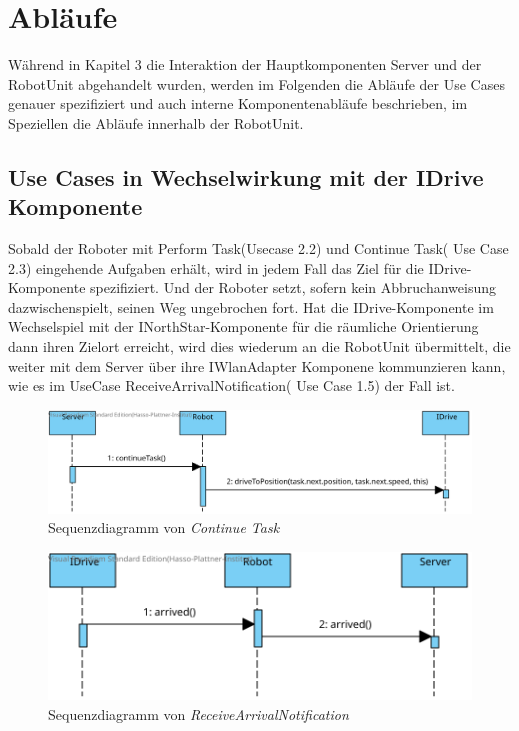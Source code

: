 \section{Abläufe}

Während in Kapitel 3 die Interaktion der Hauptkomponenten Server und der RobotUnit abgehandelt wurden, werden im Folgenden die Abläufe der Use Cases genauer spezifiziert und auch interne Komponentenabläufe beschrieben, im Speziellen die Abläufe innerhalb der RobotUnit.

\subsection*{Use Cases in Wechselwirkung mit der IDrive Komponente }
Sobald der Roboter mit Perform Task(Usecase 2.2)  und Continue Task( Use Case  2.3) eingehende Aufgaben erhält, wird in jedem Fall das Ziel für die IDrive-Komponente spezifiziert. 
Und der Roboter setzt, sofern kein Abbruchanweisung dazwischenspielt, seinen Weg ungebrochen fort. Hat die IDrive-Komponente im Wechselspiel mit der INorthStar-Komponente für die räumliche Orientierung dann ihren Zielort erreicht, wird dies wiederum an die RobotUnit übermittelt, die weiter mit dem Server über ihre IWlanAdapter Komponene kommunzieren kann, wie es im UseCase ReceiveArrivalNotification( Use Case 1.5) der Fall ist.
\\

		\begin{figure}[H]
		\centering
		\includegraphics[width=1\textwidth]{img/2-Entwurf-ContinueTask}
		\caption{Sequenzdiagramm von \emph{Continue Task}}
		\label{ReadSensors}
	\end{figure}
	
	\begin{figure}[H]
		\centering
		\includegraphics[width=1\textwidth]{img/2-Entwurf-ReceiveArrivalNotification}
		\caption{Sequenzdiagramm von \emph{ReceiveArrivalNotification}}
		\label{ReadSensors}
	\end{figure}

